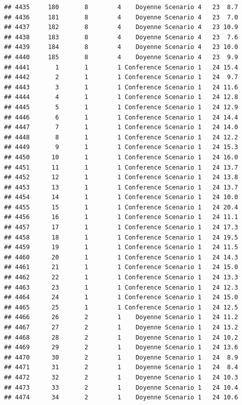 \documentclass[
]{article}
\begin{document}
\begin{verbatim}
## 4435     180       8        4    Doyenne Scenario 4   23  8.7
## 4436     181       8        4    Doyenne Scenario 4   23  7.0
## 4437     182       8        4    Doyenne Scenario 4   23 10.9
## 4438     183       8        4    Doyenne Scenario 4   23  7.6
## 4439     184       8        4    Doyenne Scenario 4   23 10.0
## 4440     185       8        4    Doyenne Scenario 4   23  9.9
## 4441       1       1        1 Conference Scenario 1   24 15.4
## 4442       2       1        1 Conference Scenario 1   24  9.7
## 4443       3       1        1 Conference Scenario 1   24 11.6
## 4444       4       1        1 Conference Scenario 1   24 12.8
## 4445       5       1        1 Conference Scenario 1   24 12.9
## 4446       6       1        1 Conference Scenario 1   24 14.4
## 4447       7       1        1 Conference Scenario 1   24 14.0
## 4448       8       1        1 Conference Scenario 1   24 12.2
## 4449       9       1        1 Conference Scenario 1   24 15.3
## 4450      10       1        1 Conference Scenario 1   24 16.0
## 4451      11       1        1 Conference Scenario 1   24 13.7
## 4452      12       1        1 Conference Scenario 1   24 13.8
## 4453      13       1        1 Conference Scenario 1   24 13.7
## 4454      14       1        1 Conference Scenario 1   24 10.0
## 4455      15       1        1 Conference Scenario 1   24 20.4
## 4456      16       1        1 Conference Scenario 1   24 11.1
## 4457      17       1        1 Conference Scenario 1   24 17.3
## 4458      18       1        1 Conference Scenario 1   24 19.5
## 4459      19       1        1 Conference Scenario 1   24 11.5
## 4460      20       1        1 Conference Scenario 1   24 14.3
## 4461      21       1        1 Conference Scenario 1   24 15.0
## 4462      22       1        1 Conference Scenario 1   24 13.3
## 4463      23       1        1 Conference Scenario 1   24 12.3
## 4464      24       1        1 Conference Scenario 1   24 15.0
## 4465      25       1        1 Conference Scenario 1   24 12.5
## 4466      26       2        1    Doyenne Scenario 1   24 11.2
## 4467      27       2        1    Doyenne Scenario 1   24 13.2
## 4468      28       2        1    Doyenne Scenario 1   24 10.2
## 4469      29       2        1    Doyenne Scenario 1   24 13.6
## 4470      30       2        1    Doyenne Scenario 1   24  8.9
## 4471      31       2        1    Doyenne Scenario 1   24  8.4
## 4472      32       2        1    Doyenne Scenario 1   24 10.3
## 4473      33       2        1    Doyenne Scenario 1   24 10.4
## 4474      34       2        1    Doyenne Scenario 1   24 10.6

\end{verbatim}
\end{document}
